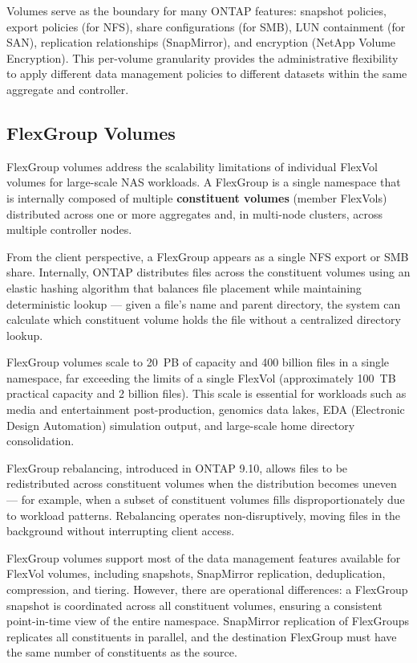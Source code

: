 Volumes serve as the boundary for many ONTAP features: snapshot policies, export policies (for NFS), share configurations (for SMB), LUN containment (for SAN), replication relationships (SnapMirror), and encryption (NetApp Volume Encryption). This per-volume granularity provides the administrative flexibility to apply different data management policies to different datasets within the same aggregate and controller.

\subsection{FlexGroup Volumes}

FlexGroup volumes address the scalability limitations of individual FlexVol volumes for large-scale NAS workloads. A FlexGroup is a single namespace that is internally composed of multiple \textbf{constituent volumes} (member FlexVols) distributed across one or more aggregates and, in multi-node clusters, across multiple controller nodes.

From the client perspective, a FlexGroup appears as a single NFS export or SMB share. Internally, ONTAP distributes files across the constituent volumes using an elastic hashing algorithm that balances file placement while maintaining deterministic lookup --- given a file's name and parent directory, the system can calculate which constituent volume holds the file without a centralized directory lookup.

FlexGroup volumes scale to 20~PB of capacity and 400 billion files in a single namespace, far exceeding the limits of a single FlexVol (approximately 100~TB practical capacity and 2 billion files). This scale is essential for workloads such as media and entertainment post-production, genomics data lakes, EDA (Electronic Design Automation) simulation output, and large-scale home directory consolidation.

FlexGroup rebalancing, introduced in ONTAP 9.10, allows files to be redistributed across constituent volumes when the distribution becomes uneven --- for example, when a subset of constituent volumes fills disproportionately due to workload patterns. Rebalancing operates non-disruptively, moving files in the background without interrupting client access.

FlexGroup volumes support most of the data management features available for FlexVol volumes, including snapshots, SnapMirror replication, deduplication, compression, and tiering. However, there are operational differences: a FlexGroup snapshot is coordinated across all constituent volumes, ensuring a consistent point-in-time view of the entire namespace. SnapMirror replication of FlexGroups replicates all constituents in parallel, and the destination FlexGroup must have the same number of constituents as the source.

